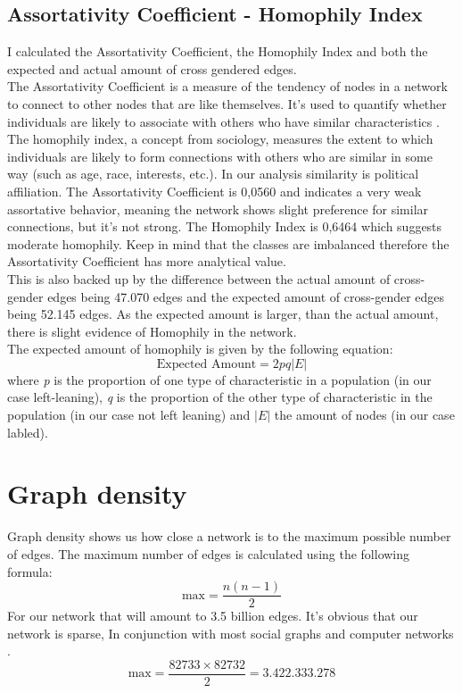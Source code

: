 \documentclass[
	a4paper, %
	12pt, %
	twoside, %
]{LTJournalArticle}
\begin{document}
\subsection{Assortativity Coefficient - Homophily Index}
I calculated the Assortativity Coefficient, the Homophily Index and both the expected and actual amount of cross gendered edges. \\
The Assortativity Coefficient is a measure of the tendency of nodes in a network to connect to other nodes that are like themselves. It’s used to quantify whether individuals are likely to associate with others who have similar characteristics \autocite{xulvi2005changing}. The homophily index, a concept from sociology, measures the extent to which individuals are likely to form connections with others who are similar in some way (such as age, race, interests, etc.). In our analysis similarity is political affiliation. The Assortativity Coefficient is 0,0560 and indicates a very weak assortative behavior, meaning the network shows slight preference for similar connections, but it's not strong. The Homophily Index is 0,6464 which suggests moderate homophily. Keep in mind that the classes are imbalanced therefore the Assortativity Coefficient has more analytical value.\\

This is also backed up by the difference between the actual amount of cross-gender edges being 47.070 edges and the expected amount of cross-gender edges being 52.145 edges. As the expected amount is larger, than the actual amount, there is slight evidence of Homophily in the network.\\
The expected amount of homophily is given by the following equation:
\[
\text{Expected Amount} = 2pq \left| E \right|
\]
where \textit{p} is the proportion of one type of characteristic in a population (in our case left-leaning), \textit{q} is the proportion of the other type of characteristic in the population (in our case not left leaning) and $\text{} \left| E \right|$ the amount of nodes (in our case labled).

\section{Graph density}
Graph density shows us how close a network is to the maximum possible number of edges. The maximum number of edges is calculated using the following formula: 
\[
{\text{max}} = \frac{n(n-1)}{2} 
\]
For our network that will amount to 3.5 billion edges. It’s obvious that our network is sparse, In conjunction with most social graphs and computer networks \autocite{barabasi2013network}.
\[
{\text{max}} = \frac{82733 \times 82732}{2} = 3.422.333.278
\]
\end{document}
